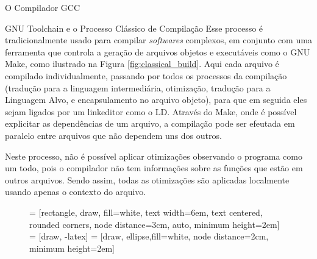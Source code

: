 \begin{section}{O Compilador GCC}
\begin{subsection}{GNU Toolchain e o Processo Clássico de Compilação}
Esse processo é tradicionalmente usado para compilar \textit{softwares} complexos,
em conjunto com uma ferramenta que controla a geração de arquivos objetos e executáveis
como o GNU Make, como ilustrado na Figura \ref{fig:classical_build}. Aqui cada arquivo
é compilado individualmente, passando por todos os processos da compilação (tradução
para a linguagem intermediária, otimização, tradução para a Linguagem Alvo,
e encapsulamento no arquivo objeto), para que em seguida eles sejam ligados por um
linkeditor como o LD. Através do Make, onde é possível explicitar as dependências de
um arquivo, a compilação pode ser efeutada em paralelo entre arquivos que não dependem
uns dos outros.

Neste processo, não é possível aplicar otimizações observando o programa como
um todo, pois o compilador não tem informações sobre as funções que estão em
outros arquivos. Sendo assim, todas as otimizações são aplicadas localmente
usando apenas o contexto do arquivo.

\begin{figure}
 = [rectangle, draw, fill=white,
    text width=6em, text centered, rounded corners, node distance=3cm, auto, minimum height=2em]
 = [draw, -latex]
 = [draw, ellipse,fill=white, node distance=2cm,
    minimum height=2em]
\begin{center}
\end{center}
\end{figure}
\end{subsection}
\end{section}
